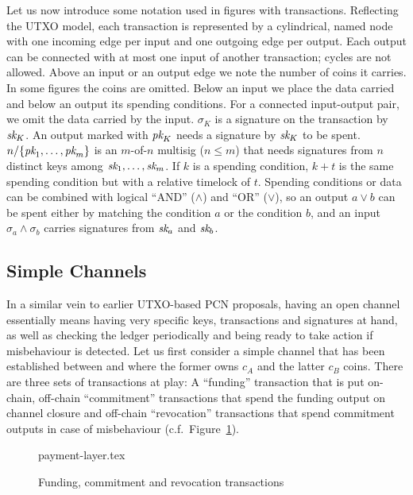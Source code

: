   Let us now introduce some notation used in figures with transactions.
  Reflecting the UTXO model, each transaction is represented by a cylindrical,
  named node with one incoming edge per input and one outgoing edge per output.
  Each output can be connected with at most one input of another transaction;
  cycles are not allowed. Above an input or an output edge we note the number of
  coins it carries. In some figures the coins are omitted. Below an input we
  place the data carried and below an output its spending conditions. For
  a connected input-output pair, we omit the data carried by the input.
  $\sigma_K$ is a signature on the transaction by $\textit{sk}_{K}$. An output marked
  with $\textit{pk}_{K}$ needs a signature by $\textit{sk}_{K}$ to be spent. $n/\{\textit{pk}_{1}, \dots,
  \textit{pk}_{m}\}$ is an $m$-of-$n$ multisig ($n \leq m$) that needs signatures from
  $n$ distinct keys among $\textit{sk}_{1}, \dots, \textit{sk}_{m}$. If $k$ is a spending
  condition, $k + t$ is the same spending condition but with a relative timelock
  of $t$. Spending conditions or data can be combined with logical ``AND''
  ($\wedge$) and ``OR'' ($\vee$), so an output $a \vee b$ can be spent either by
  matching the condition $a$ or the condition $b$, and an input $\sigma_a \wedge
  \sigma_b$ carries signatures from $\textit{sk}_{a}$ and $\textit{sk}_{b}$.

\subsection{Simple Channels}
  In a similar vein to earlier UTXO-based PCN proposals, having an open channel essentially
  means having very specific keys, transactions and signatures at hand, as well
  as checking the ledger periodically and being ready to take action if
  misbehaviour is detected. Let us first consider a simple channel that has been
  established between \alice and \bob where the former owns $c_A$ and the latter
  $c_B$ coins. There are three sets of transactions at play: A ``funding''
  transaction that is put on-chain, off-chain ``commitment'' transactions that
  spend the funding output on channel closure and off-chain ``revocation''
  transactions that spend commitment outputs in case of misbehaviour (c.f.\
  Figure~\ref{figure:payment-layer}).

  \begin{figure}
    {payment-layer.tex}
    \caption{Funding, commitment and revocation transactions}
    \label{figure:payment-layer}
  \end{figure}

